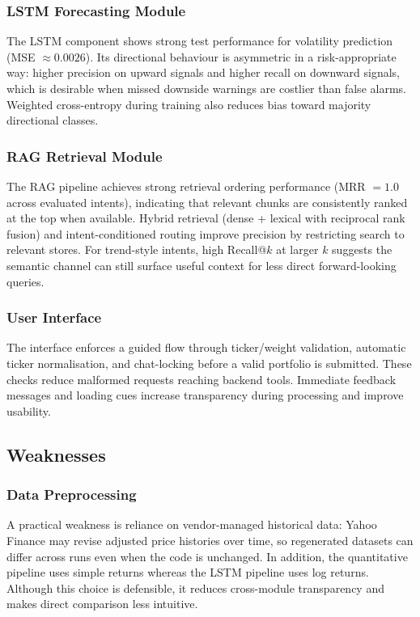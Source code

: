 \subsubsection{LSTM Forecasting Module}
The LSTM component shows strong test performance for volatility prediction (MSE \(\approx 0.0026\)). Its directional behaviour is asymmetric in a risk-appropriate way: higher precision on upward signals and higher recall on downward signals, which is desirable when missed downside warnings are costlier than false alarms. Weighted cross-entropy during training also reduces bias toward majority directional classes.

\subsubsection{RAG Retrieval Module}
The RAG pipeline achieves strong retrieval ordering performance (MRR \(=1.0\) across evaluated intents), indicating that relevant chunks are consistently ranked at the top when available. Hybrid retrieval (dense + lexical with reciprocal rank fusion) and intent-conditioned routing improve precision by restricting search to relevant stores. For trend-style intents, high Recall@\(k\) at larger \(k\) suggests the semantic channel can still surface useful context for less direct forward-looking queries.

\subsubsection{User Interface}
The interface enforces a guided flow through ticker/weight validation, automatic ticker normalisation, and chat-locking before a valid portfolio is submitted. These checks reduce malformed requests reaching backend tools. Immediate feedback messages and loading cues increase transparency during processing and improve usability.



\subsection{Weaknesses}

\subsubsection{Data Preprocessing}
A practical weakness is reliance on vendor-managed historical data: Yahoo Finance may revise adjusted price histories over time, so regenerated datasets can differ across runs even when the code is unchanged. In addition, the quantitative pipeline uses simple returns whereas the LSTM pipeline uses log returns. Although this choice is defensible, it reduces cross-module transparency and makes direct comparison less intuitive.

